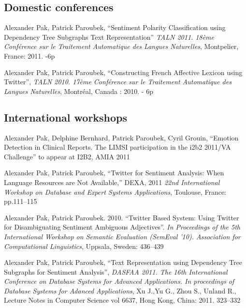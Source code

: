 \documentclass[letterpaper]{article}
\renewenvironment{itemize}{
  \begin{list}{}{
    \setlength{\leftmargin}{0.6em}
  }
}{
  \end{list}
}
\begin{document}
\subsection*{Domestic conferences}

\begin{itemize}

\item Alexander Pak, Patrick Paroubek, ``Sentiment Polarity Classification using Dependency Tree Subgraphs Text Representation'' {\it TALN 2011. 18\`eme Conf\'erence sur le Traitement Automatique des Langues Naturelles}, Montpelier, France: 2011. -6p

\item Alexander Pak, Patrick Paroubek, ``Constructing French Affective Lexicon using Twitter'', {\it TALN 2010. 17\`eme Conf\'erence sur le Traitement Automatique des Langues Naturelles}, Montr\'eal, Canada : 2010. - 6p

\end{itemize}

\subsection*{International workshops}

\begin{itemize}

\item Alexander Pak, Delphine Bernhard, Patrick Paroubek, Cyril Grouin, ``Emotion Detection in Clinical Reports. The LIMSI participation in the i2b2 2011/VA
Challenge'' to appear at I2B2, AMIA 2011

\item Alexander Pak, Patrick Paroubek, ``Twitter for Sentiment Analysis: When Language Resources are Not Available,'' DEXA, 2011 {\it 22nd International Workshop on Database and Expert Systems Applications}, Toulouse, France: pp.111--115

\item Alexander Pak, Patrick Paroubek. 2010. ``Twitter Based System: Using Twitter for Disambiguating Sentiment Ambiguous Adjectives''. {\it In Proceedings of the 5th
International Workshop on Semantic Evaluation (SemEval '10). Association for
Computational Linguistics}, Uppsala, Sweden: 436--439

\item Alexander Pak, Patrick Paroubek, ``Text Representation using Dependency Tree
Subgraphs for Sentiment Analysis'', {\it DASFAA 2011. The 16th International Conference on Database Systems for Advanced Applications. In proceedings of Database Systems for Adanced Applications}, Xu J.,Yu G., Zhou S., Unland R., Lecture Notes in Computer Science vol 6637, Hong Kong, China: 2011. 323--332

\end{itemize}
\end{document}

